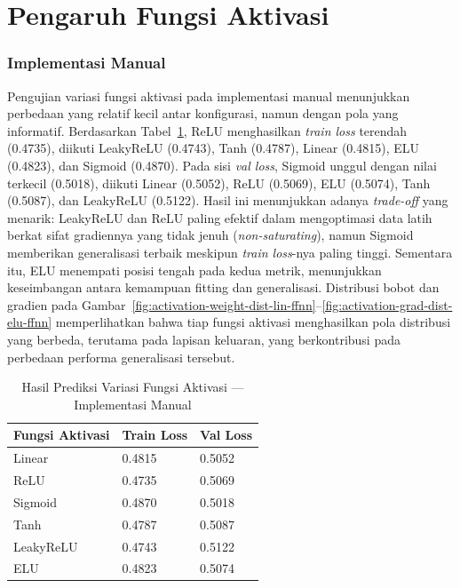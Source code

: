 \section{Pengaruh Fungsi Aktivasi}

\subsubsection{Implementasi Manual}

Pengujian variasi fungsi aktivasi pada implementasi manual menunjukkan perbedaan yang relatif kecil antar konfigurasi, 
namun dengan pola yang informatif. Berdasarkan Tabel~\ref{tab:activation-ffnn}, ReLU menghasilkan \textit{train loss} 
terendah (0.4735), diikuti LeakyReLU (0.4743), Tanh (0.4787), Linear (0.4815), ELU (0.4823), dan Sigmoid (0.4870). Pada sisi 
\textit{val loss}, Sigmoid unggul dengan nilai terkecil (0.5018), diikuti Linear (0.5052), ReLU (0.5069), ELU (0.5074), 
Tanh (0.5087), dan LeakyReLU (0.5122). Hasil ini menunjukkan adanya \textit{trade-off} yang menarik: 
LeakyReLU dan ReLU paling efektif dalam mengoptimasi data latih berkat sifat gradiennya yang tidak jenuh (\textit{non-saturating}), 
namun Sigmoid memberikan generalisasi terbaik meskipun \textit{train loss}-nya paling tinggi. Sementara itu, 
ELU menempati posisi tengah pada kedua metrik, menunjukkan keseimbangan antara kemampuan fitting dan generalisasi. 
Distribusi bobot dan gradien pada Gambar~\ref{fig:activation-weight-dist-lin-ffnn}--\ref{fig:activation-grad-dist-elu-ffnn} 
memperlihatkan bahwa tiap fungsi aktivasi menghasilkan pola distribusi yang berbeda, terutama pada lapisan keluaran, yang 
berkontribusi pada perbedaan performa generalisasi tersebut.

\begin{table}[H]
    \centering
    \caption{Hasil Prediksi Variasi Fungsi Aktivasi — Implementasi Manual}
    \begin{tabular}{lll}
        \toprule
        \textbf{Fungsi Aktivasi} & \textbf{Train Loss} & \textbf{Val Loss} \\
        \midrule
        Linear     & 0.4815 & 0.5052 \\
        ReLU       & 0.4735 & 0.5069 \\
        Sigmoid    & 0.4870 & 0.5018 \\
        Tanh       & 0.4787 & 0.5087 \\
        LeakyReLU  & 0.4743 & 0.5122 \\
        ELU        & 0.4823 & 0.5074 \\
        \bottomrule
    \end{tabular}
    \label{tab:activation-ffnn}
\end{table}

